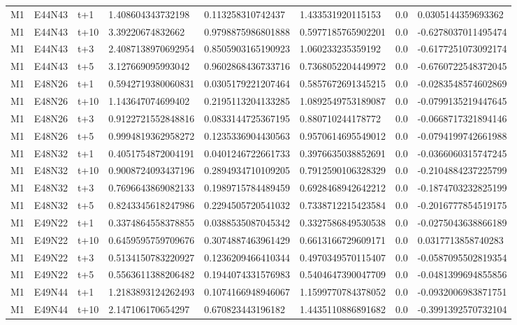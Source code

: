 \begin{landscape}
\begin{longtable}{llllllll}
M1 & E44N43 & t+1 & 1.408604343732198 & 0.113258310742437 & 1.433531920115153 & 0.0 & 0.0305144359693362 \\
M1 & E44N43 & t+10 & 3.39220674832662 & 0.9798875986801888 & 0.5977185765902201 & 0.0 & -0.6278037011495474 \\
M1 & E44N43 & t+3 & 2.4087138970692954 & 0.8505903165190923 & 1.060233235359192 & 0.0 & -0.6177251073092174 \\
M1 & E44N43 & t+5 & 3.127669095993042 & 0.9602868436733716 & 0.7368052204449972 & 0.0 & -0.6760722548372045 \\
M1 & E48N26 & t+1 & 0.5942719380060831 & 0.0305179221207464 & 0.5857672691345215 & 0.0 & -0.0283548574602869 \\
M1 & E48N26 & t+10 & 1.143647074699402 & 0.2195113204133285 & 1.0892549753189087 & 0.0 & -0.0799135219447645 \\
M1 & E48N26 & t+3 & 0.9122721552848816 & 0.0833144725367195 & 0.880710244178772 & 0.0 & -0.0668717321894146 \\
M1 & E48N26 & t+5 & 0.9994819362958272 & 0.1235336904430563 & 0.9570614695549012 & 0.0 & -0.0794199742661988 \\
M1 & E48N32 & t+1 & 0.4051754872004191 & 0.0401246722661733 & 0.3976635038852691 & 0.0 & -0.0366060315747245 \\
M1 & E48N32 & t+10 & 0.9008724093437196 & 0.2894934710109205 & 0.7912590106328329 & 0.0 & -0.2104884237225799 \\
M1 & E48N32 & t+3 & 0.7696643869082133 & 0.1989715784489459 & 0.6928468942642212 & 0.0 & -0.1874703232825199 \\
M1 & E48N32 & t+5 & 0.8243345618247986 & 0.2294505720541032 & 0.7338712215423584 & 0.0 & -0.2016777854519175 \\
M1 & E49N22 & t+1 & 0.3374864558378855 & 0.0388535087045342 & 0.3327586849530538 & 0.0 & -0.0275043638866189 \\
M1 & E49N22 & t+10 & 0.6459595759709676 & 0.3074887463961429 & 0.6613166729609171 & 0.0 & 0.0317713858740283 \\
M1 & E49N22 & t+3 & 0.5134150783220927 & 0.1236209466410344 & 0.4970349570115407 & 0.0 & -0.0587095502819354 \\
M1 & E49N22 & t+5 & 0.5563611388206482 & 0.1944074331576983 & 0.5404647390047709 & 0.0 & -0.0481399694855856 \\
M1 & E49N44 & t+1 & 1.2183893124262493 & 0.1074166948946067 & 1.1599770784378052 & 0.0 & -0.0932006983871751 \\
M1 & E49N44 & t+10 & 2.147106170654297 & 0.670823443196182 & 1.4435110886891682 & 0.0 & -0.3991392570732104 \\

\end{longtable}
\end{landscape}
